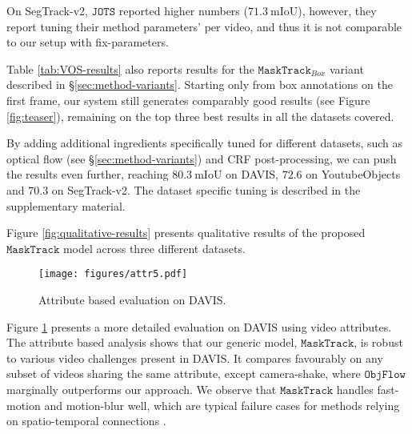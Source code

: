 \documentclass[10pt,twocolumn,letterpaper]{article}
\makeatletter
\renewcommand{\paragraph}{\@startsection{paragraph}{4}{\z@}{0.5ex \@plus 1ex \@minus .2ex}{-0.5em}{\normalfont \normalsize \bfseries}}
\newcommand{\segtrack}{SegTrack-v2}
\makeatother
\begin{document}
On \segtrack{}, $\mathtt{JOTS}$ \cite{Wen2015Cvpr} reported higher numbers ($71.3\ \text{mIoU}$), however, they report tuning their method parameters' per video, and thus it is not comparable to our setup with fix-parameters.

Table \ref{tab:VOS-results} also reports results for the $\mathtt{MaskTrack}_{Box}$ variant described in \S\ref{sec:method-variants}.
Starting only from box annotations on the first frame, our system still generates comparably good results (see Figure \ref{fig:teaser}), remaining on the top three best results in all the datasets covered.

By adding additional ingredients specifically tuned for different datasets, such as optical flow (see \S\ref{sec:method-variants}) and CRF post-processing, we can push the results even further, reaching
$80.3\ \text{mIoU}$ on DAVIS, $72.6$ on YoutubeObjects and  $70.3$ on \segtrack{}. The dataset specific tuning is described in the supplementary material.

Figure \ref{fig:qualitative-results} presents qualitative results of the proposed $\mathtt{MaskTrack}$ model across three different datasets.




\begin{figure}
\begin{centering}
\texttt{[image: figures/attr5.pdf]}
\par\end{centering}
\caption{\label{fig:attribute_analysis} Attribute based evaluation on DAVIS.}
\end{figure}




\paragraph{Attribute-based analysis}
Figure \ref{fig:attribute_analysis} presents a more detailed evaluation on DAVIS \cite{Perazzi2016Cvpr} using video attributes.
The attribute based analysis shows that our generic model, $\mathtt{MaskTrack}$,
is robust to various video challenges present in DAVIS. It compares favourably on any subset of videos sharing the same attribute, except camera-shake, where $\mathtt{ObjFlow}$ \cite{Tsai2016Cvpr} marginally outperforms our approach.
We observe that $\mathtt{MaskTrack}$ handles fast-motion and motion-blur well, which are
typical failure cases for methods relying on spatio-temporal connections
\cite{Maerki2016Cvpr, Tsai2016Cvpr}.
\end{document}
